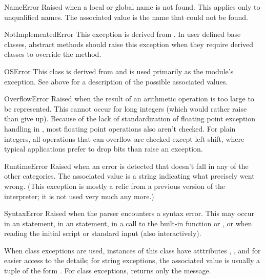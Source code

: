 \begin{excdesc}{NameError}
  Raised when a local or global name is not found.  This applies only
  to unqualified names.  The associated value is the name that could
  not be found.
\end{excdesc}

\begin{excdesc}{NotImplementedError}
  This exception is derived from .  In user
  defined base classes, abstract methods should raise this exception
  when they require derived classes to override the method.
\end{excdesc}

\begin{excdesc}{OSError}
  This class is derived from  and is used
  primarily as the  module's  exception.
  See  above for a description of the
  possible associated values.
\end{excdesc}

\begin{excdesc}{OverflowError}
  Raised when the result of an arithmetic operation is too large to be
  represented.  This cannot occur for long integers (which would rather
  raise  than give up).  Because of the lack of
  standardization of floating point exception handling in \C{}, most
  floating point operations also aren't checked.  For plain integers,
  all operations that can overflow are checked except left shift, where
  typical applications prefer to drop bits than raise an exception.
\end{excdesc}

\begin{excdesc}{RuntimeError}
  Raised when an error is detected that doesn't fall in any of the
  other categories.  The associated value is a string indicating what
  precisely went wrong.  (This exception is mostly a relic from a
  previous version of the interpreter; it is not used very much any
  more.)
\end{excdesc}

\begin{excdesc}{SyntaxError}
  Raised when the parser encounters a syntax error.  This may occur in
  an  statement, in an  statement, in a call
  to the built-in function  or , or
  when reading the initial script or standard input (also
  interactively).

When class exceptions are used, instances of this class have
atttributes , ,  and
 for easier access to the details; for string exceptions,
the associated value is usually a tuple of the form
.
For class exceptions,  returns only the message.
\end{excdesc}

